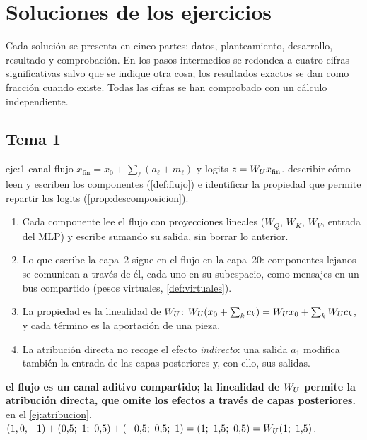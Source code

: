 \chapter{Soluciones de los ejercicios}
\label{ap:soluciones}

Cada solución se presenta en cinco partes: datos, planteamiento, desarrollo, resultado y comprobación. En los pasos intermedios se redondea a cuatro cifras significativas salvo que se indique otra cosa; los resultados exactos se dan como fracción cuando existe. Todas las cifras se han comprobado con un cálculo independiente.

\section{Tema 1}

\begin{solucion}{eje:1-canal}
\datos flujo $x_{\mathrm{fin}}=x_0+\sum_\ell(a_\ell+m_\ell)$ y logits $z=W_{U} x_{\mathrm{fin}}$.
\planteamiento describir cómo leen y escriben los componentes (\cref{def:flujo}) e identificar la propiedad que permite repartir los logits (\cref{prop:descomposicion}).
\pasos
\begin{enumerate}[label=\arabic*.]
  \item Cada componente lee el flujo con proyecciones lineales ($W_Q$, $W_K$, $W_V$, entrada del MLP) y escribe sumando su salida, sin borrar lo anterior.
  \item Lo que escribe la capa~2 sigue en el flujo en la capa~20: componentes lejanos se comunican a través de él, cada uno en su subespacio, como mensajes en un bus compartido (pesos virtuales, \cref{def:virtuales}).
  \item La propiedad es la linealidad de $W_{U}$: $W_{U}(x_0+\sum_kc_k)=W_{U} x_0+\sum_kW_{U} c_k$, y cada término es la aportación de una pieza.
  \item La atribución directa no recoge el efecto \emph{indirecto}: una salida $a_1$ modifica también la entrada de las capas posteriores y, con ello, sus salidas.
\end{enumerate}
\resultado \textbf{el flujo es un canal aditivo compartido; la linealidad de $W_{U}$ permite la atribución directa, que omite los efectos a través de capas posteriores.}
\comprobacion en el \cref{ej:atribucion}, $(1,0,-1)+(0{,}5;\allowbreak\ 1;\allowbreak\ 0{,}5)+(-0{,}5;\allowbreak\ 0{,}5;\allowbreak\ 1)=(1;\allowbreak\ 1{,}5;\allowbreak\ 0{,}5)=\WU(1;\allowbreak\ 1{,}5)$.
\end{solucion}

